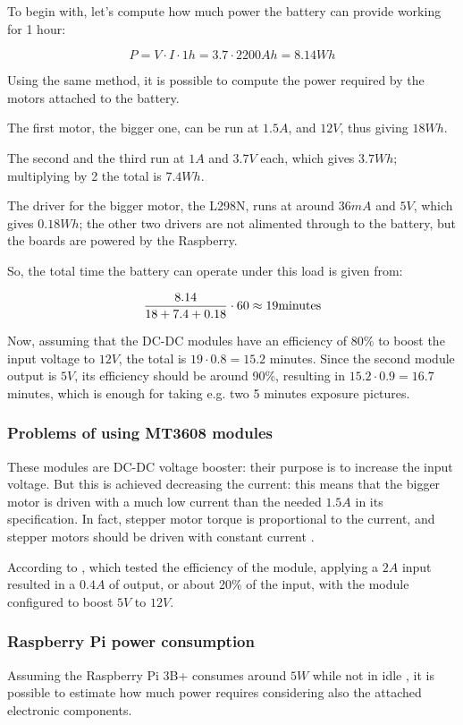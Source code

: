\documentclass[]{article}
\begin{document}
To begin with, let's compute how much power the battery can provide working for 1 hour:

$$ P = V\cdot I \cdot 1h  = 3.7 \cdot 2200Ah = 8.14 Wh $$

Using the same method, it is possible to compute the power required by the motors attached to the battery.

The first motor, the bigger one, can be run at $1.5A$, and $12V$, thus giving $18Wh$.

The second and the third run at $1A$ and $3.7V$ each, which gives $3.7Wh$; multiplying by 2 the total is $7.4Wh$. 

The driver for the bigger motor, the L298N, runs at around $36mA$ and $5V$, which gives $0.18Wh$; the other two drivers are not alimented through to the battery, but the boards are powered by the Raspberry.

So, the total time the battery can operate under this load is given from:

$$ \frac{8.14}{18 + 7.4 + 0.18} \cdot 60 \approx 19 \textnormal{minutes} $$

Now, assuming that the DC-DC modules have an efficiency of 80\% \cite{mtspecs} to boost the input voltage to $12V$, 
the total is $19\cdot 0.8 = 15.2 $ minutes. Since the second module output is $5V$, its efficiency should be around 90\%, resulting in $15.2\cdot 0.9 = 16.7$ minutes, which is enough for taking e.g. two 5 minutes exposure pictures.

\subsubsection{Problems of using MT3608 modules}
These modules are DC-DC voltage booster: their purpose is to increase the input voltage. But this is achieved decreasing the current: this means that the bigger motor is driven with a much low current than the needed $1.5A$ in its specification. In fact, stepper motor torque is proportional to the current, and stepper motors should be driven with constant current \cite{steppermcurrent}.

According to \cite{mteffspec}, which tested the efficiency of the module, applying a $2A$ input resulted in a $0.4A$ of output, or about 20\% of the input, with the module configured to boost $5V$ to $12V$.

\subsubsection{Raspberry Pi power consumption}
Assuming the Raspberry Pi 3B+ consumes around $5W$ while not in idle \cite{powerbenchmark}, it is possible to estimate how much power requires considering also the attached electronic components. 
\end{document}
